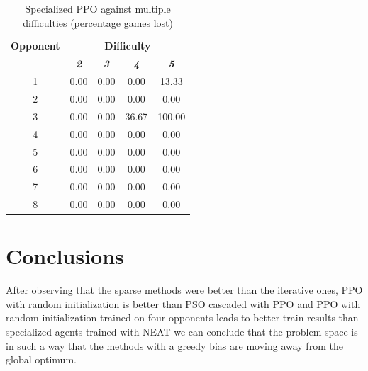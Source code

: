 \documentclass[conference]{IEEEtran}
\begin{document}
    \begin{table}[htbp]
        \caption{Specialized PPO against multiple difficulties (percentage games lost)}
        \begin{center}
            \begin{tabular}{|c|c|c|c|c|}
                \hline
                \textbf{Opponent} & \multicolumn{4}{|c|}{\textbf{Difficulty}} \\
                \cline{2-5}
                & \textbf{\textit{2}} & \textbf{\textit{3}} & \textbf{\textit{4}} & \textbf{\textit{5}} \\
                \hline
                1 & 0.00                & 0.00                & 0.00                & 13.33               \\
                2 & 0.00                & 0.00                & 0.00                & 0.00                \\
                3 & 0.00                & 0.00                & 36.67               & 100.00              \\
                4 & 0.00                & 0.00                & 0.00                & 0.00                \\
                5 & 0.00                & 0.00                & 0.00                & 0.00                \\
                6 & 0.00                & 0.00                & 0.00                & 0.00                \\
                7 & 0.00                & 0.00                & 0.00                & 0.00                \\
                8 & 0.00                & 0.00                & 0.00                & 0.00                \\
                \hline
            \end{tabular}
            \label{Specialized PPO against multiple difficulties (percentage games lost)}
        \end{center}
    \end{table}


    \section{Conclusions}\label{sec:conclusions}
    After observing that the sparse methods were better than the iterative ones,
    PPO with random initialization is better than PSO cascaded with PPO and
    PPO with random initialization trained on four opponents leads to better train results
    than specialized agents trained with NEAT we can conclude that the problem space is in such a
    way that the methods with a greedy bias are moving away from the global optimum.
\end{document}
